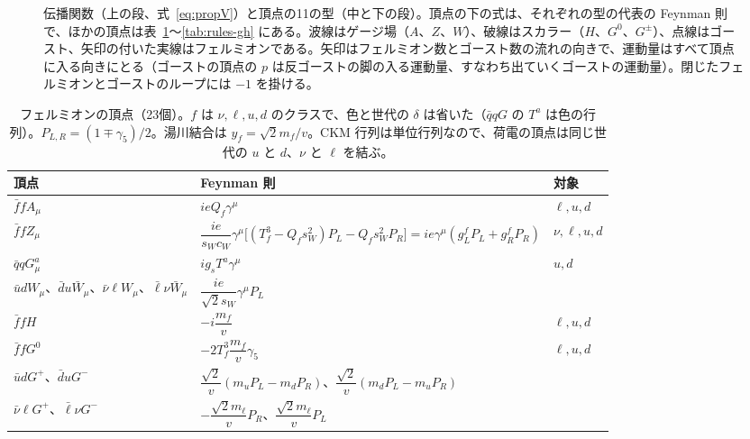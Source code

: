 \documentclass[a4paper,10pt]{ltjsarticle}
\newcommand{\sw}{s_W}
\newcommand{\cw}{c_W}
\begin{document}
\begin{figure}[tbp]
\caption{伝播関数（上の段、式~\eqref{eq:propV}）と頂点の11の型（中と下の段）。頂点の下の式は、それぞれの型の代表の Feynman 則で、ほかの頂点は表~\ref{tab:rules-f}〜\ref{tab:rules-gh} にある。波線はゲージ場（$A$、$Z$、$W$）、破線はスカラー（$H$、$G^0$、$G^\pm$）、点線はゴースト、矢印の付いた実線はフェルミオンである。矢印はフェルミオン数とゴースト数の流れの向きで、運動量はすべて頂点に入る向きにとる（ゴーストの頂点の $p$ は反ゴーストの脚の入る運動量、すなわち出ていくゴーストの運動量）。閉じたフェルミオンとゴーストのループには $-1$ を掛ける。}
\label{fig:rulesfig}
\end{figure}

\begin{table}[tbp]
\centering\small\renewcommand{\arraystretch}{1.75}
\caption{フェルミオンの頂点（23個）。$f$ は $\nu,\ell,u,d$ のクラスで、色と世代の $\delta$ は省いた（$\bar qqG$ の $T^a$ は色の行列）。$P_{L,R}=(1\mp\gamma_5)/2$。湯川結合は $y_f=\sqrt2m_f/v$。CKM 行列は単位行列なので、荷電の頂点は同じ世代の $u$ と $d$、$\nu$ と $\ell$ を結ぶ。}
\label{tab:rules-f}
\begin{tabular}{lll}
\toprule
頂点 & Feynman 則 & 対象 \\
\midrule
$\bar ffA_{\mu}$ & $ieQ_f\gamma^\mu$ & $\ell,u,d$ \\
$\bar ffZ_\mu$ & $\dfrac{ie}{\sw\cw}\gamma^\mu\bigl[(T^3_f-Q_f\sw^2)P_L-Q_f\sw^2P_R\bigr]=ie\gamma^\mu(g_L^fP_L+g_R^fP_R)$ & $\nu,\ell,u,d$ \\
$\bar qqG^a_\mu$ & $ig_sT^a\gamma^\mu$ & $u,d$ \\
$\bar udW_\mu$、$\bar du\bar W_\mu$、$\bar\nu\ell W_\mu$、$\bar\ell\nu\bar W_\mu$ & $\dfrac{ie}{\sqrt2\sw}\gamma^\mu P_L$ & \\
$\bar ffH$ & $-i\dfrac{m_f}{v}$ & $\ell,u,d$ \\
$\bar ffG^0$ & $-2T^3_f\dfrac{m_f}{v}\gamma_5$ & $\ell,u,d$ \\
$\bar udG^+$、$\bar duG^-$ & $\dfrac{\sqrt2}{v}(m_uP_L-m_dP_R)$、$\dfrac{\sqrt2}{v}(m_dP_L-m_uP_R)$ & \\
$\bar\nu\ell G^+$、$\bar\ell\nu G^-$ & $-\dfrac{\sqrt2m_\ell}{v}P_R$、$\dfrac{\sqrt2m_\ell}{v}P_L$ & \\
\bottomrule
\end{tabular}
\end{table}
\end{document}
